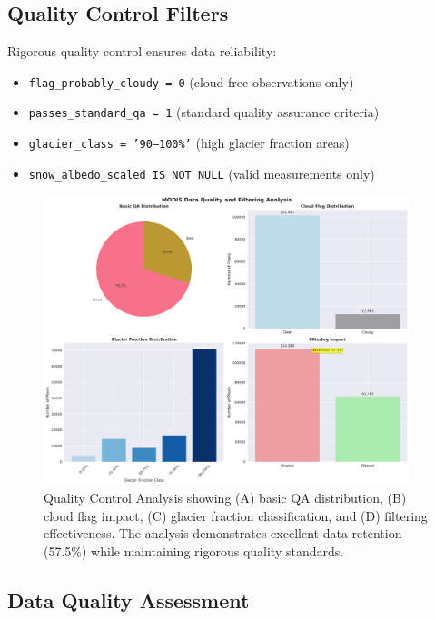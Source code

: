 \documentclass[12pt,a4paper]{article}
\begin{document}
\subsection{Quality Control Filters}

Rigorous quality control ensures data reliability:
\begin{itemize}
    \item \texttt{flag\_probably\_cloudy = 0} (cloud-free observations only)
    \item \texttt{passes\_standard\_qa = 1} (standard quality assurance criteria)
    \item \texttt{glacier\_class = '90--100\%'} (high glacier fraction areas)
    \item \texttt{snow\_albedo\_scaled IS NOT NULL} (valid measurements only)
\end{itemize}

\begin{figure}[H]
\centering
\includegraphics[width=0.95\textwidth]{plots/qa_quality_analysis.png}
\caption{Quality Control Analysis showing (A) basic QA distribution, (B) cloud flag impact, (C) glacier fraction classification, and (D) filtering effectiveness. The analysis demonstrates excellent data retention (57.5\%) while maintaining rigorous quality standards.}
\label{fig:qa_analysis}
\end{figure}

\subsection{Data Quality Assessment}
\end{document}
